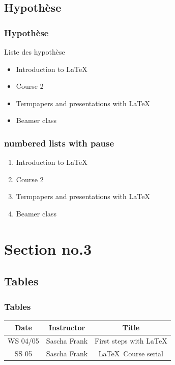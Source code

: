\documentclass{beamer}
\begin{document}
        \subsection{Hypothèse}
        \begin{frame}\frametitle{Hypothèse}
            \begin{exampleblock}{Liste des hypothèse}
                \begin{itemize}
                    \item Introduction to  \LaTeX \pause 
                    \item Course 2 \pause 
                    \item Termpapers and presentations with \LaTeX \pause 
                    \item Beamer class
                \end{itemize}
            \end{exampleblock} 
        \end{frame}

\begin{frame}\frametitle{numbered lists with pause}
\begin{enumerate}
\item Introduction to  \LaTeX \pause 
\item Course 2 \pause 
\item Termpapers and presentations with \LaTeX \pause 
\item Beamer class
\end{enumerate}
\end{frame}

\section{Section no.3} 
\subsection{Tables}
\begin{frame}\frametitle{Tables}
\begin{tabular}{|c|c|c|}
\hline
\textbf{Date} & \textbf{Instructor} & \textbf{Title} \\
\hline
WS 04/05 & Sascha Frank & First steps with  \LaTeX  \\
\hline
SS 05 & Sascha Frank & \LaTeX \ Course serial \\
\hline
\end{tabular}
\end{frame}
\end{document}
